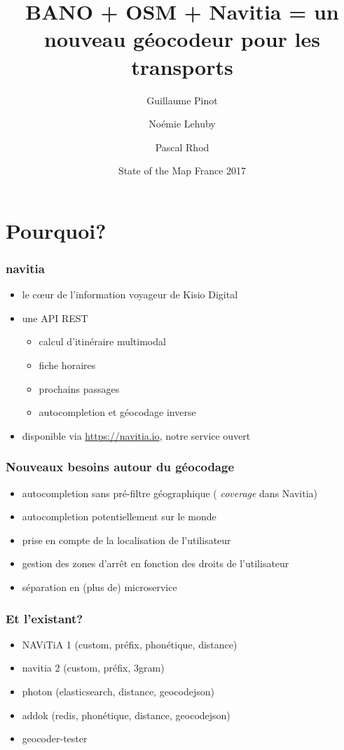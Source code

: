 \documentclass[table]{beamer}
\title[BANO + OSM + Navitia]{BANO + OSM + Navitia = un nouveau géocodeur pour les transports}
\author{Guillaume Pinot \and Noémie Lehuby \and Pascal Rhod}
\institute[Kisio Digital] %
{
  Kisio Digital\\
  20 rue Hector Malot\\
  75012 Paris, France}
\date{State of the Map France 2017}
\newcommand*{\foreign}[2][english]{%
    \emph{\foreignlanguage{#1}{#2}}%
}
\begin{document}
\begin{frame}
  \titlepage
\end{frame}

\section{Pourquoi?}

\begin{frame}
  \frametitle{navitia}

  \begin{itemize}
  \item le cœur de l'information voyageur de Kisio Digital
  \item une API REST
    \begin{itemize}
    \item calcul d'itinéraire multimodal
    \item fiche horaires
    \item prochains passages
    \item autocompletion et géocodage inverse
    \end{itemize}
  \item disponible via \url{https://navitia.io}, notre service ouvert
  \end{itemize}
\end{frame}

\begin{frame}
  \frametitle{Nouveaux besoins autour du géocodage}

  \begin{itemize}
  \item autocompletion sans pré-filtre géographique (\foreign{coverage} dans Navitia)
  \item autocompletion potentiellement sur le monde
  \item prise en compte de la localisation de l'utilisateur
  \item gestion des zones d'arrêt en fonction des droits de l'utilisateur
  \item séparation en (plus de) microservice
  \end{itemize}
\end{frame}

\begin{frame}
  \frametitle{Et l'existant?}

  \begin{itemize}
  \item NAViTiA 1 (custom, préfix, phonétique, distance)
  \item navitia 2 (custom, préfix, 3gram)
  \item photon (elasticsearch, distance, geocodejson)
  \item addok (redis, phonétique, distance, geocodejson)
  \item geocoder-tester
  \end{itemize}
\end{frame}
\end{document}
